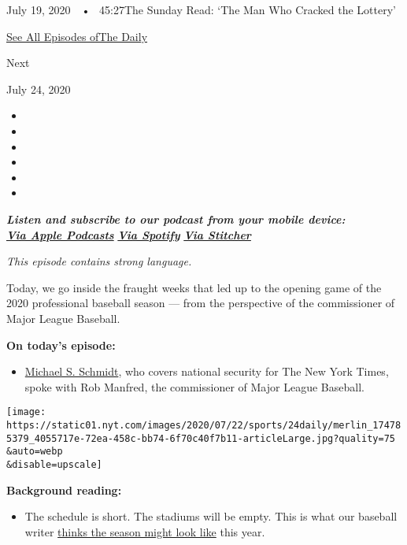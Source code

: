 July 19, 2020~~•~ 45:27The Sunday Read: `The Man Who Cracked the
Lottery'

\href{https://www.nytimes.com/column/the-daily}{See All Episodes ofThe
Daily}

Next

July 24, 2020

\begin{itemize}
\item
\item
\item
\item
\item
\item
\end{itemize}

\emph{\textbf{Listen and subscribe to our podcast from your mobile
device:}}\\
\textbf{\href{https://itunes.apple.com/us/podcast/the-daily/id1200361736?mt=2}{\emph{Via
Apple Podcasts}}} \emph{\textbf{\textbar{}}}
\textbf{\href{https://open.spotify.com/show/3IM0lmZxpFAY7CwMuv9H4g?si=SfuMSC55R1qprFsRZU3_zw}{\emph{Via
Spotify}}} \emph{\textbf{\textbar{}}}
\textbf{\href{http://www.stitcher.com/podcast/the-new-york-times/the-daily-10}{\emph{Via
Stitcher}}}

\emph{This episode contains strong language.}

Today, we go inside the fraught weeks that led up to the opening game of
the 2020 professional baseball season --- from the perspective of the
commissioner of Major League Baseball.

\textbf{On today's episode:}

\begin{itemize}
\tightlist
\item
  \href{https://www.nytimes.com/by/michael-s-schmidt?smid=pc-thedaily}{Michael
  S. Schmidt}, who covers national security for The New York Times,
  spoke with Rob Manfred, the commissioner of Major League Baseball.
\end{itemize}

\texttt{[image: https://static01.nyt.com/images/2020/07/22/sports/24daily/merlin\_174785379\_4055717e-72ea-458c-bb74-6f70c40f7b11-articleLarge.jpg?quality=75\\\&auto=webp\\\&disable=upscale]}

\textbf{Background reading:}

\begin{itemize}
\tightlist
\item
  The schedule is short. The stadiums will be empty. This is what our
  baseball writer
  \href{https://www.nytimes.com/2020/07/23/sports/baseball/mlb-season-coronavirus.html}{thinks
  the season might look like} this year.
\end{itemize}

